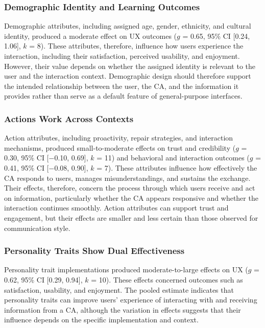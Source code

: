 \documentclass[preprint,review,12pt,authoryear,nonatbib]{elsarticle}
\begin{document}
\subsubsection{Demographic Identity and Learning Outcomes}

Demographic attributes, including assigned age, gender, ethnicity, and cultural identity, produced a moderate effect on UX outcomes ($g$ = 0.65, 95\% CI [0.24, 1.06], $k$ = 8). These attributes, therefore, influence how users experience the interaction, including their satisfaction, perceived usability, and enjoyment. However, their value depends on whether the assigned identity is relevant to the user and the interaction context. Demographic design should therefore support the intended relationship between the user, the CA, and the information it provides rather than serve as a default feature of general-purpose interfaces.

\subsubsection{Actions Work Across Contexts}

Action attributes, including proactivity, repair strategies, and interaction mechanisms, produced small-to-moderate effects on trust and credibility ($g$ = 0.30, 95\% CI [$-$0.10, 0.69], $k$ = 11) and behavioral and interaction outcomes ($g$ = 0.41, 95\% CI [$-$0.08, 0.90], $k$ = 7). These attributes influence how effectively the CA responds to users, manages misunderstandings, and sustains the exchange. Their effects, therefore, concern the process through which users receive and act on information, particularly whether the CA appears responsive and whether the interaction continues smoothly. Action attributes can support trust and engagement, but their effects are smaller and less certain than those observed for communication style.

\subsubsection{Personality Traits Show Dual Effectiveness}\label{sec:person}

Personality trait implementations produced moderate-to-large effects on UX ($g$ = 0.62, 95\% CI [0.29, 0.94], $k$ = 10). These effects concerned outcomes such as satisfaction, usability, and enjoyment. The pooled estimate indicates that personality traits can improve users' experience of interacting with and receiving information from a CA, although the variation in effects suggests that their influence depends on the specific implementation and context.
\end{document}
